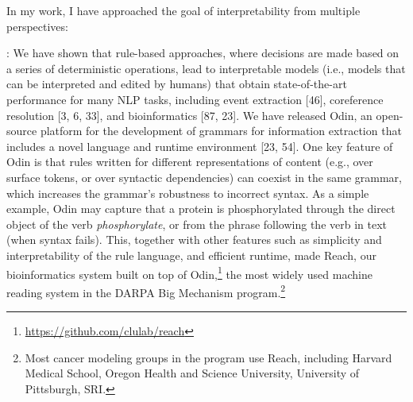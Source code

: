 \documentclass[10pt]{article}
\begin{document}
In my work, I have approached the goal of interpretability from multiple perspectives:

{}: We have shown that rule-based approaches, where decisions are made based on a series of deterministic operations, lead to interpretable models (i.e., models that can be interpreted and edited by humans) that obtain state-of-the-art performance for many NLP tasks, including event extraction [46], coreference resolution [3, 6, 33], and bioinformatics [87, 23]. We have released Odin, an open-source platform  for the development of grammars for information extraction that includes a novel language and runtime environment [23, 54]. One key feature of Odin is that rules written for different representations of content (e.g., over surface tokens, or over syntactic dependencies) can coexist in the same grammar, which increases the grammar's robustness to incorrect syntax. 
As a simple example, Odin may capture that a protein is phosphorylated through the direct object of the verb {\em phosphorylate}, or from the phrase following the verb in text (when syntax fails). 
This, together with other features such as simplicity and interpretability of the rule language, and efficient runtime, made Reach, our bioinformatics system built on top of Odin,\footnote{{\scriptsize \url{https://github.com/clulab/reach}}} the most widely used machine reading system in the DARPA Big Mechanism program.\footnote{Most cancer modeling groups in the program use Reach, including Harvard Medical School, Oregon Health and Science University, University of Pittsburgh, SRI.}
\end{document}
